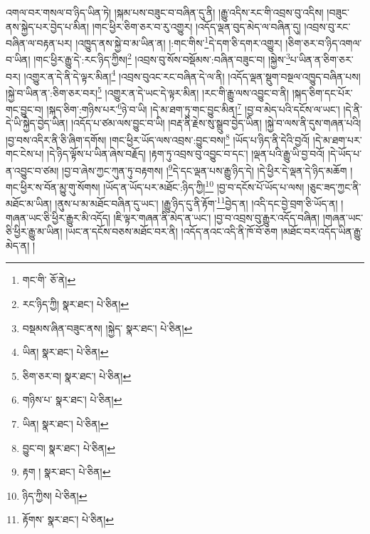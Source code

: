 འགལ་བར་གསལ་བ་ཉིད་ཡིན་ཏེ། །སྐམ་པས་བཟུང་བ་བཞིན་དུ་ནི། །རྒྱུ་འདིས་རང་གི་འབྲས་བུ་འདིས། །བཟུང་ནས་སྐྱེད་པར་བྱེད་པ་མིན། །གང་ཕྱིར་ཅིག་ཅར་བ་རུ་འགྱུར། །འདོད་ལྡན་བུད་མེད་ལ་བཞིན་དུ། །འབྲས་བུ་རང་བཞིན་ལ་བརྟན་པར། །འཁྱུད་ནས་སྐྱེ་བ་མ་ཡིན་ན། །:གང་གིས་\footnote{གང་གི་  ཅོ་ནེ། }དེ་དག་ཅི་དགར་འགྱུར། །ཅིག་ཅར་བ་ཉིད་འགལ་བ་ཡིན། །གང་ཕྱིར་རྒྱུ་དེ་:རང་ཉིད་ཀྱིས།\footnote{རང་ཉིད་ཀྱི།  སྣར་ཐང་།  པེ་ཅིན། } །འབྲས་བུ་སོས་བསྡོམས་:བཞིན་བཟུང་བ། །སྐྱེས་\footnote{བསྡམས་ཞིན་བཟུང་ནས། །སྐྱེད་  སྣར་ཐང་།  པེ་ཅིན། }པ་ཡིན་ན་ཅིག་ཅར་བར། །འགྱུར་ན་དེ་ནི་དེ་ལྟར་མིན།\footnote{ཡིན།  སྣར་ཐང་།  པེ་ཅིན། } །འབྲས་བུའང་རང་བཞིན་དེ་ལ་ནི། །འདོད་ལྡན་སྡུག་བསྔལ་འཁྱུད་བཞིན་པས། །སྐྱེ་བ་ཡིན་ན་:ཅིག་ཅར་བར།\footnote{ཅིག་ཅར་བ།  སྣར་ཐང་།  པེ་ཅིན། } །འགྱུར་ན་དེ་ཡང་དེ་ལྟར་མིན། །རང་གི་རྒྱུ་ལས་འབྱུང་བ་ནི། །སྐད་ཅིག་དང་པོར་གང་བྱུང་བ། །སྐད་ཅིག་:གཉིས་པར་\footnote{གཉིས་པ་  སྣར་ཐང་།  པེ་ཅིན། }ཉེ་བ་ཡི། །དེ་མ་ཐག་ཏུ་གང་བྱུང་མིན།\footnote{ཡིན།  སྣར་ཐང་།  པེ་ཅིན། } །བྱ་བ་མེད་པའི་དངོས་ལ་ཡང་། །དེ་ནི་དེ་ཡི་སྐྱེད་བྱེད་ཡིན། །འདོད་པ་ཙམ་ལས་བྱུང་བ་ཡི། །བརྡ་ནི་རྗེས་སུ་སྒྲུབ་བྱེད་ཡིན། །སྐྱེ་བ་ལས་ནི་དུས་གཞན་པའི། །བྱ་བས་འདིར་ནི་ཅི་ཞིག་དགོས། །གང་ཕྱིར་ཡོད་ལས་འབྲས་:བྱུང་བས།\footnote{བྱུང་བ།  སྣར་ཐང་།  པེ་ཅིན། } །ཡོད་པ་ཉིད་ནི་དེའི་བྱའོ། །དེ་མ་ཐག་པར་གང་ངེས་པ། །དེ་ཉིད་ལྟོས་པ་ཡིན་ཞེས་བརྗོད། །རྟག་ཏུ་འབྲས་བུ་འབྱུང་བ་དང་། །ལྡན་པའི་རྒྱུ་ཡི་བྱ་བའོ། །དེ་ཡོད་པ་ན་འབྱུང་བ་ཙམ། །བྱ་བ་ཞེས་ཀྱང་ཀུན་ཏུ་བརྟགས། །\footnote{རྟག །  སྣར་ཐང་།  པེ་ཅིན། }དེ་དང་ལྡན་པས་རྒྱུ་ཉིད་དེ། །དེ་ཕྱིར་དེ་ལྡན་དེ་ཉིད་མཆོག །གང་ཕྱིར་ས་བོན་མྱུ་གུ་སོགས། །ཡོད་ན་ཡོད་པར་མཐོང་:ཉིད་ཀྱི།\footnote{ཉིད་ཀྱིས།  པེ་ཅིན། } །བྱ་བ་དངོས་པོ་ཡོད་པ་ལས། །ཅུང་ཟད་ཀྱང་ནི་མཐོང་མ་ཡིན། །ནུས་པ་མ་མཐོང་བཞིན་དུ་ཡང་། །རྒྱུ་ཉིད་དུ་ནི་རྟོག་\footnote{རྟོགས་  སྣར་ཐང་།  པེ་ཅིན། }བྱེད་ན། །འདི་དང་བྱེ་བྲག་ཅི་ཡོད་ན། །གཞན་ཡང་ཅི་ཕྱིར་རྒྱུར་མི་འདོད། །ཇི་ལྟར་གཞན་ནི་མེད་ན་ཡང་། །བྱ་བ་འབྲས་བུ་རྒྱུར་འདོད་བཞིན། །གཞན་ཡང་ཅི་ཕྱིར་རྒྱུ་མ་ཡིན། །ཡང་ན་དངོས་བཅས་མཐོང་བར་ནི། །འདོད་ནའང་འདི་ནི་ཁོ་བོ་ཅག །མཐོང་བར་འདོད་ཡིན་རྒྱུ་མེད་ན། །
